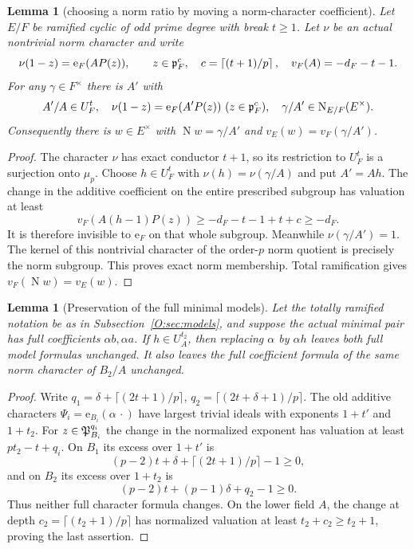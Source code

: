 \documentclass[11pt]{amsart}
\newtheorem{lemma}[theorem]{Lemma}
\theoremstyle{definition}
\theoremstyle{remark}
\newcommand{\Nm}{\operatorname{N}}
\newcommand{\ceil}[1]{\left\lceil #1\right\rceil}
\newcommand{\ee}{\mathrm e}\newcommand{\echar}{\mathrm e}\newcommand{\FF}{\mathbf F}
\begin{document}
\begin{lemma}[choosing a norm ratio by moving a norm-character coefficient]
\label{O:P:choose}
Let $E/F$ be ramified cyclic of odd prime degree with break $t\ge1$.
Let $\nu$ be an actual nontrivial norm character and write
\[
 \nu(1-z)=\ee_F(A P(z)),\qquad z\in\pp_F^{c},\quad
 c=\ceil{(t+1)/p},\quad v_F(A)=-d_F-t-1.
\]
For any $\gamma\in F^\times$ there is $A'$ with
\[
 A'/A\in U_F^t,\quad
 \nu(1-z)=\ee_F(A'P(z))\ (z\in\pp_F^c),\quad
 \gamma/A'\in\Nm_{E/F}(E^\times).
\]
Consequently there is $w\in E^\times$ with
$\Nm w=\gamma/A'$ and $v_E(w)=v_F(\gamma/A')$.
\end{lemma}
\begin{proof}
The character $\nu$ has exact conductor $t+1$, so its restriction to
$U_F^t$ is a surjection onto $\mu_p$.
Choose $h\in U_F^t$ with $\nu(h)=\nu(\gamma/A)$ and put $A'=Ah$.
The change in the additive coefficient on the entire prescribed
subgroup has valuation at least
\[
 v_F(A(h-1)P(z))\ge-d_F-t-1+t+c\ge-d_F.
\]
It is therefore invisible to $\ee_F$ on that whole subgroup.
Meanwhile $\nu(\gamma/A')=1$. The kernel of this nontrivial
character of the order-$p$ norm quotient is precisely the norm
subgroup. This proves exact norm membership. Total ramification gives
$v_F(\Nm w)=v_E(w)$.
\end{proof}

\begin{lemma}[Preservation of the full minimal models]\label{O:P:preserve}
Let the totally ramified notation be as in Subsection~\ref{O:sec:models}, and
suppose the actual minimal pair has full coefficients $\alpha b,\alpha a$.
If $h\in U_A^{t_2}$, then replacing $\alpha$ by $\alpha h$ leaves both
full model formulas unchanged. It also leaves the full coefficient formula
of the same norm character of $B_2/A$ unchanged.
\end{lemma}
\begin{proof}
Write $q_1=\delta+\lceil(2t+1)/p\rceil$, $q_2=\lceil(2t+\delta+1)/p\rceil$.
The old additive characters $\Psi_i=\ee_{B_i}(\alpha\,\cdot)$ have largest
trivial ideals with exponents $1+t'$ and $1+t_2$.
For $z\in\mathfrak P_{B_i}^{q_i}$ the change in the normalized exponent has
valuation at least $pt_2-t+q_i$. On $B_1$ its excess over $1+t'$ is
\[
 (p-2)t+\delta+\lceil(2t+1)/p\rceil-1\ge0,
\]
and on $B_2$ its excess over $1+t_2$ is
\[
 (p-2)t+(p-1)\delta+q_2-1\ge0.
\]
Thus neither full character formula changes. On the lower field $A$, the
change at depth $c_2=\lceil(t_2+1)/p\rceil$ has normalized valuation at
least $t_2+c_2\ge t_2+1$, proving the last assertion.
\end{proof}
\end{document}
